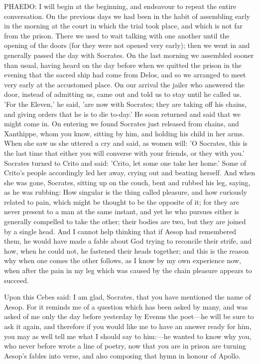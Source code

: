 PHAEDO: I will begin at the beginning, and endeavour to repeat the entire
conversation. On the previous days we had been in the habit of assembling
early in the morning at the court in which the trial took place, and which
is not far from the prison. There we used to wait talking with one another
until the opening of the doors (for they were not opened very early); then
we went in and generally passed the day with Socrates. On the last morning
we assembled sooner than usual, having heard on the day before when we
quitted the prison in the evening that the sacred ship had come from
Delos, and so we arranged to meet very early at the accustomed place. On
our arrival the jailer who answered the door, instead of admitting us,
came out and told us to stay until he called us. 'For the Eleven,' he
said, 'are now with Socrates; they are taking off his chains, and giving
orders that he is to die to-day.' He soon returned and said that we might
come in. On entering we found Socrates just released from chains, and
Xanthippe, whom you know, sitting by him, and holding his child in her
arms. When she saw us she uttered a cry and said, as women will: 'O
Socrates, this is the last time that either you will converse with your
friends, or they with you.' Socrates turned to Crito and said: 'Crito, let
some one take her home.' Some of Crito's people accordingly led her away,
crying out and beating herself. And when she was gone, Socrates, sitting
up on the couch, bent and rubbed his leg, saying, as he was rubbing: How
singular is the thing called pleasure, and how curiously related to pain,
which might be thought to be the opposite of it; for they are never
present to a man at the same instant, and yet he who pursues either is
generally compelled to take the other; their bodies are two, but they are
joined by a single head. And I cannot help thinking that if Aesop had
remembered them, he would have made a fable about God trying to reconcile
their strife, and how, when he could not, he fastened their heads
together; and this is the reason why when one comes the other follows, as
I know by my own experience now, when after the pain in my leg which was
caused by the chain pleasure appears to succeed.

Upon this Cebes said: I am glad, Socrates, that you have mentioned the
name of Aesop. For it reminds me of a question which has been asked by
many, and was asked of me only the day before yesterday by Evenus the poet—he
will be sure to ask it again, and therefore if you would like me to have
an answer ready for him, you may as well tell me what I should say to him:—he
wanted to know why you, who never before wrote a line of poetry, now that
you are in prison are turning Aesop's fables into verse, and also
composing that hymn in honour of Apollo.

